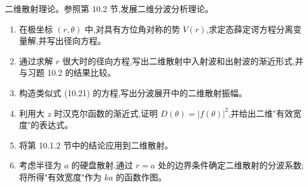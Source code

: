 \begin{question}
二维散射理论。参照第 10.2 节,发展二维分波分析理论。
\begin{enumerate}
\item 在极坐标 $(r,\theta)$ 中,对具有方位角对称的势 $V(r)$,求定态薛定谔方程分离变量解,并写出径向方程。
\item 通过求解 $r$ 很大时的径向方程,写出二维散射中入射波和出射波的渐近形式,并与习题 10.2 的结果比较。
\item 构造类似式 (10.21) 的方程,写出分波展开中的二维散射振幅。
\item 利用大 $z$ 时汉克尔函数的渐近式,证明 $D(\theta)=|f(\theta)|^2$,并给出二维"有效宽度"的表达式。
\item 将第 10.1.2 节中的结论应用到二维散射。
\item 考虑半径为 $a$ 的硬盘散射,通过 $r=a$ 处的边界条件确定二维散射的分波系数;将所得"有效宽度"作为 $ka$ 的函数作图。
\end{enumerate}

\par\smallskip
{}

\end{question}
